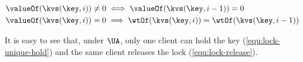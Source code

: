 \spaceshrink{-17pt}
{\displaymathfont
\begin{align}
& \valueOf(\kvs(\key,i)) \neq 0 \iff \valueOf(\kvs(\key,i-1)) = 0
\label{equ:lock-unique-hold}
\\ & \valueOf(\kvs(\key,i)) = 0 \implies \wtOf(\kvs(\key,i)) = \wtOf(\kvs(\key,i-1))
\label{equ:lock-release}
\end{align}
\normalsize}
\spaceshrink{-17pt}

\noindent
It is easy to see that, under \( \UA \), 
only one client can hold the key (\cref{equ:lock-unique-hold}) 
and the same client releases the lock (\cref{equ:lock-release}).

